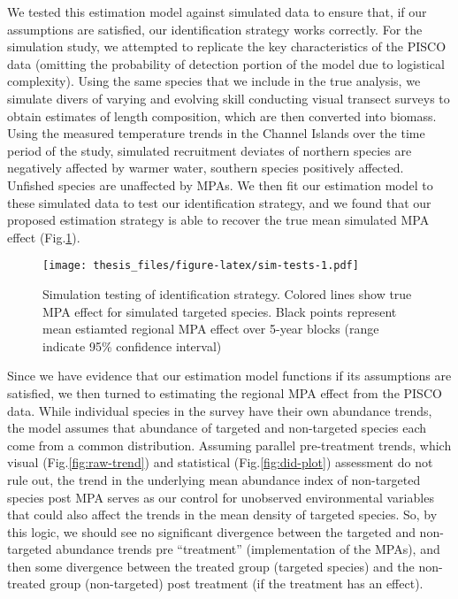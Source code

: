 \documentclass[twoside,12pt,final]{ucthesis-CA2012}
\begin{document}
\begin{ucmainmatter}
We tested this estimation model against simulated data to ensure that,
if our assumptions are satisfied, our identification strategy works
correctly. For the simulation study, we attempted to replicate the key
characteristics of the PISCO data (omitting the probability of detection
portion of the model due to logistical complexity). Using the same
species that we include in the true analysis, we simulate divers of
varying and evolving skill conducting visual transect surveys to obtain
estimates of length composition, which are then converted into biomass.
Using the measured temperature trends in the Channel Islands over the
time period of the study, simulated recruitment deviates of northern
species are negatively affected by warmer water, southern species
positively affected. Unfished species are unaffected by MPAs. We then
fit our estimation model to these simulated data to test our
identification strategy, and we found that our proposed estimation
strategy is able to recover the true mean simulated MPA effect
(Fig.\ref{fig:sim-tests}).
\begin{figure}
\centering
\texttt{[image: thesis\_files/figure-latex/sim-tests-1.pdf]}
\caption{\label{fig:sim-tests}Simulation testing of identification strategy.
Colored lines show true MPA effect for simulated targeted species. Black
points represent mean estiamted regional MPA effect over 5-year blocks
(range indicate 95\% confidence interval)}
\end{figure}
Since we have evidence that our estimation model functions if its
assumptions are satisfied, we then turned to estimating the regional MPA
effect from the PISCO data. While individual species in the survey have
their own abundance trends, the model assumes that abundance of targeted
and non-targeted species each come from a common distribution. Assuming
parallel pre-treatment trends, which visual (Fig.\ref{fig:raw-trend})
and statistical (Fig.\ref{fig:did-plot}) assessment do not rule out, the
trend in the underlying mean abundance index of non-targeted species
post MPA serves as our control for unobserved environmental variables
that could also affect the trends in the mean density of targeted
species. So, by this logic, we should see no significant divergence
between the targeted and non-targeted abundance trends pre ``treatment''
(implementation of the MPAs), and then some divergence between the
treated group (targeted species) and the non-treated group
(non-targeted) post treatment (if the treatment has an effect).


\end{ucmainmatter}
\end{document}
